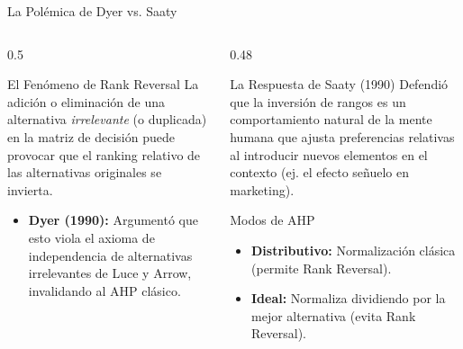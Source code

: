\documentclass[aspectratio=169, 10pt]{beamer}
\begin{document}
\begin{frame}{La Polémica de Dyer vs. Saaty}
    \begin{columns}[T]
        \begin{column}{0.5\textwidth}
            \begin{block}{El Fenómeno de Rank Reversal}
                La adición o eliminación de una alternativa \textit{irrelevante} (o duplicada) en la matriz de decisión puede provocar que el ranking relativo de las alternativas originales se invierta.
            \end{block}
            \begin{itemize}
                \item \textbf{Dyer (1990):} Argumentó que esto viola el axioma de independencia de alternativas irrelevantes de Luce y Arrow, invalidando al AHP clásico.
            \end{itemize}
        \end{column}
        \begin{column}{0.48\textwidth}
            \begin{block}{La Respuesta de Saaty (1990)}
                Defendió que la inversión de rangos es un comportamiento natural de la mente humana que ajusta preferencias relativas al introducir nuevos elementos en el contexto (ej. el efecto señuelo en marketing).
            \end{block}
            \begin{exampleblock}{Modos de AHP}
                \scriptsize
                \begin{itemize}
                    \item \textbf{Distributivo:} Normalización clásica (permite Rank Reversal).
                    \item \textbf{Ideal:} Normaliza dividiendo por la mejor alternativa (evita Rank Reversal).
                \end{itemize}
            \end{exampleblock}
        \end{column}
    \end{columns}
\end{frame}
\end{document}
